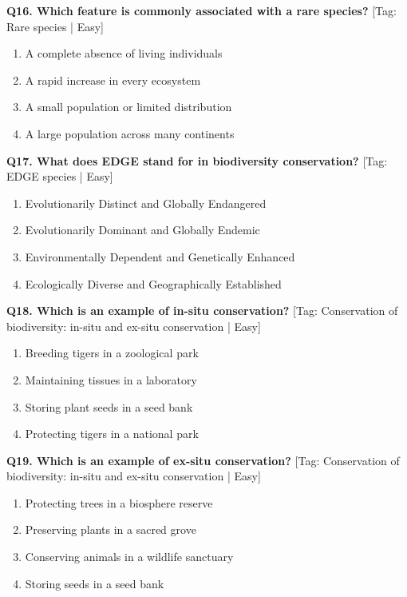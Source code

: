 \noindent\textbf{Q16. Which feature is commonly associated with a rare species?} \hfill [Tag: Rare species | Easy]
\begin{enumerate}[label=(\alph*),topsep=2pt,itemsep=1pt,partopsep=0pt,parsep=0pt]
    \item {A complete absence of living individuals}
    \item {A rapid increase in every ecosystem}
    \item {A small population or limited distribution}
    \item {A large population across many continents}
\end{enumerate}
\vspace{2mm}

\noindent\textbf{Q17. What does EDGE stand for in biodiversity conservation?} \hfill [Tag: EDGE species | Easy]
\begin{enumerate}[label=(\alph*),topsep=2pt,itemsep=1pt,partopsep=0pt,parsep=0pt]
    \item {Evolutionarily Distinct and Globally Endangered}
    \item {Evolutionarily Dominant and Globally Endemic}
    \item {Environmentally Dependent and Genetically Enhanced}
    \item {Ecologically Diverse and Geographically Established}
\end{enumerate}
\vspace{2mm}

\noindent\textbf{Q18. Which is an example of in-situ conservation?} \hfill [Tag: Conservation of biodiversity: in-situ and ex-situ conservation | Easy]
\begin{enumerate}[label=(\alph*),topsep=2pt,itemsep=1pt,partopsep=0pt,parsep=0pt]
    \item {Breeding tigers in a zoological park}
    \item {Maintaining tissues in a laboratory}
    \item {Storing plant seeds in a seed bank}
    \item {Protecting tigers in a national park}
\end{enumerate}
\vspace{2mm}

\noindent\textbf{Q19. Which is an example of ex-situ conservation?} \hfill [Tag: Conservation of biodiversity: in-situ and ex-situ conservation | Easy]
\begin{enumerate}[label=(\alph*),topsep=2pt,itemsep=1pt,partopsep=0pt,parsep=0pt]
    \item {Protecting trees in a biosphere reserve}
    \item {Preserving plants in a sacred grove}
    \item {Conserving animals in a wildlife sanctuary}
    \item {Storing seeds in a seed bank}
\end{enumerate}
\vspace{2mm}

